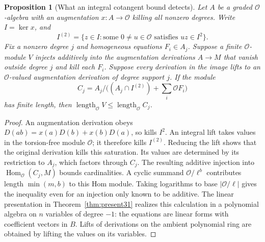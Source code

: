 \documentclass[a4paper,11pt]{article}
\newtheorem{proposition}{Proposition}[section]
\theoremstyle{definition}
\theoremstyle{remark}
\newcommand{\len}{\operatorname{length}}\newcommand{\Res}{\operatorname*{Res}}
\numberwithin{equation}{section}
\newcommand{\OO}{\mathcal O}
\begin{document}
\begin{proposition}[What an integral cotangent bound detects]\label{prop:sat31}
Let \(A\) be a graded \(\OO\)-algebra with an augmentation \(x:A\to\OO\) killing all nonzero degrees. Write \(I=\ker x\), and
\[
 I^{(2)}=\{z\in I:\text{some }0\ne u\in\OO\text{ satisfies }uz\in I^2\}.
\]
Fix a nonzero degree \(j\) and homogeneous equations \(F_i\in A_j\). Suppose a finite \(\OO\)-module \(V\) injects additively into the augmentation derivations \(A\to M\) that vanish outside degree \(j\) and kill each \(F_i\). Suppose every derivation in the image lifts to an \(\OO\)-valued augmentation derivation of degree support \(j\). If the module
\[
 C_j=A_j/\bigl((A_j\cap I^{(2)})+\textstyle\sum_i\OO F_i\bigr)
\]
has finite length, then \(\len_{\OO}V\le\len_{\OO}C_j\).
\end{proposition}
\begin{proof}
An augmentation derivation obeys \(D(ab)=x(a)D(b)+x(b)D(a)\), so kills \(I^2\). An integral lift takes values in the torsion-free module \(\OO\); it therefore kills \(I^{(2)}\). Reducing the lift shows that the original derivation kills this saturation. Its values are determined by its restriction to \(A_j\), which factors through \(C_j\). The resulting additive injection into \(\operatorname{Hom}_{\OO}(C_j,M)\) bounds cardinalities. A cyclic summand \(\OO/\ell^b\) contributes length \(\min(m,b)\) to this Hom module. Taking logarithms to base \(|\OO/\ell|\) gives the inequality even for an injection only known to be additive. The linear presentation in Theorem~\ref{thm:present31} realizes this calculation in a polynomial algebra on \(n\) variables of degree \(-1\): the equations are linear forms with coefficient vectors in \(B\). Lifts of derivations on the ambient polynomial ring are obtained by lifting the values on its variables.
\end{proof}
\end{document}
